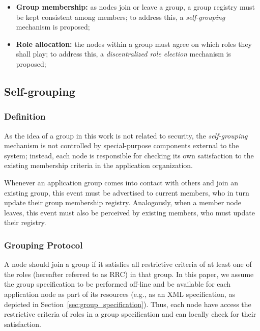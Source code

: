 \begin{itemize}
	
	\item \textbf{Group membership:} as nodes join or leave a group, a group registry must be kept consistent among members;
	to address this, a \textit{self-grouping} mechanism is proposed;
	
	\item \textbf{Role allocation:} the nodes within a group must agree on which roles they shall play; to address this, a  \textit{discentralized role election} mechanism is proposed;
		
\end{itemize}

\subsection{Self-grouping} 

\subsubsection{\textbf{Definition}} As the idea of a group in this work is not related to security, the \textit{self-grouping} mechanism is not controlled by special-purpose components external to the system; instead, each node is responsible for checking its own satisfaction to the existing membership criteria in the application organization. 

Whenever an application group comes into contact with others and join an existing group, this event must be  advertised to current members, who in turn update their group membership registry. Analogously, when a member node leaves, this event must also be perceived by existing members, who must update their registry.

\subsubsection{\textbf{Grouping Protocol}} 

A node should join a group if it satisfies all restrictive criteria of at least one of the roles (hereafter referred to as RRC) in that group. In this paper, we assume the group specification to be performed off-line and be available for each application node as part of its resources (e.g., as an XML specification, as depicted in Section~\ref{sec:group_specification}). Thus, each node have access the restrictive criteria of roles in a group specification and can locally check for their satisfaction. 



